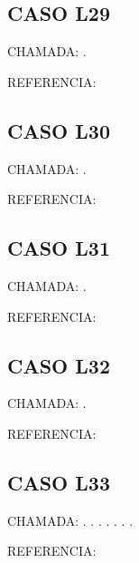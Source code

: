 \documentclass{undftex}
\begin{document}
\begin{refsection}\section*{CASO L29} CHAMADA: . \textcite{l29}\par REFERENCIA:\par\printbibliography[heading=none,check=undfconsultadas]\end{refsection}\clearpage
\begin{refsection}\section*{CASO L30} CHAMADA: . \textcite{l30}\par REFERENCIA:\par\printbibliography[heading=none,check=undfconsultadas]\end{refsection}\clearpage
\begin{refsection}\section*{CASO L31} CHAMADA: . \textcite{l31}\par REFERENCIA:\par\printbibliography[heading=none,check=undfconsultadas]\end{refsection}\clearpage
\begin{refsection}\section*{CASO L32} CHAMADA: . \textcite{l32}\par REFERENCIA:\par\printbibliography[heading=none,check=undfconsultadas]\end{refsection}\clearpage
\begin{refsection}\section*{CASO L33} CHAMADA: . \textcite{l03}. \textcite{l28}. \textcite{l03}. \textcite{l27}. \textcite{lcontrib}. \textcite{l29}. \textcite{l03}\par REFERENCIA:\par\printbibliography[heading=none,check=undfconsultadas]\end{refsection}\clearpage
\end{document}
